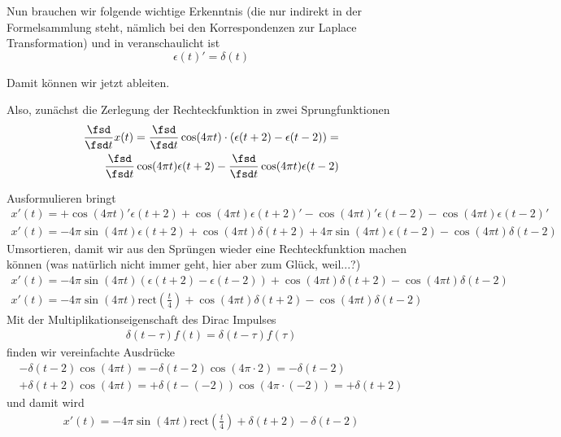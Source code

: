 \begin{ExCalc}
Nun brauchen wir folgende wichtige Erkenntnis (die nur indirekt in der Formelsammlung
steht, nämlich bei den Korrespondenzen zur Laplace Transformation) und in
 veranschaulicht ist
\begin{equation}
  \epsilon(t)' = \delta(t)
\end{equation}

Damit können wir jetzt ableiten.

Also, zunächst die Zerlegung der Rechteckfunktion in zwei Sprungfunktionen
\begin{align}
\frac{\fsd }{\fsd t} x(t) =
\frac{\fsd }{\fsd t} \cos(4\pi t) \cdot \left( \epsilon(t+2) -\epsilon(t-2)\right)=\\
\frac{\fsd }{\fsd t} \cos(4\pi t) \epsilon(t+2)
- \frac{\fsd }{\fsd t} \cos(4\pi t) \epsilon(t-2)
\end{align}

Ausformulieren bringt
\begin{align}x'(t)=
+ \cos(4\pi t)' \epsilon(t+2) + \cos(4\pi t) \epsilon(t+2)'
- \cos(4\pi t)' \epsilon(t-2) - \cos(4\pi t) \epsilon(t-2)'
\end{align}
\begin{align}x'(t)=
- 4\pi\sin(4\pi t) \epsilon(t+2) + \cos(4\pi t) \delta(t+2)
+ 4\pi\sin(4\pi t) \epsilon(t-2) - \cos(4\pi t) \delta(t-2)
\end{align}
Umsortieren, damit wir aus den Sprüngen wieder eine Rechteckfunktion machen können
(was natürlich nicht immer geht, hier aber zum Glück, weil...?)
\begin{align}x'(t)=
- 4\pi\sin(4\pi t) (\epsilon(t+2) - \epsilon(t-2))
+ \cos(4\pi t) \delta(t+2)
- \cos(4\pi t) \delta(t-2)
\end{align}
\begin{align}x'(t)=
- 4\pi\sin(4\pi t) \mathrm{rect}(\frac{t}{4})
+ \cos(4\pi t) \delta(t+2)
- \cos(4\pi t) \delta(t-2)
\end{align}
Mit der Multiplikationseigenschaft des Dirac Impulses
\begin{align}
\delta(t-\tau) f(t) = \delta(t-\tau) f(\tau)
\end{align}
finden wir vereinfachte Ausdrücke
\begin{align}
- \delta(t-2) \cos(4\pi t) = - \delta(t-2) \cos(4\pi \cdot 2) = - \delta(t-2)\\
+ \delta(t+2) \cos(4\pi t) = + \delta(t-(-2)) \cos(4\pi \cdot (-2)) = + \delta(t+2)
\end{align}
und damit wird
\begin{align}x'(t)=
- 4\pi\sin(4\pi t) \mathrm{rect}(\frac{t}{4})
+ \delta(t+2)
- \delta(t-2)
\end{align}
\end{ExCalc}

